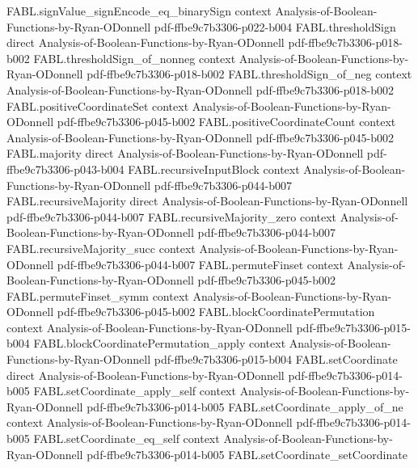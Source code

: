 \begin{theorem}
  {FABL.signValue_signEncode_eq_binarySign}
  {context}
  {Analysis-of-Boolean-Functions-by-Ryan-ODonnell}
  {pdf-ffbe9c7b3306-p022-b004}
\proofstep
  {FABL.thresholdSign}
  {direct}
  {Analysis-of-Boolean-Functions-by-Ryan-ODonnell}
  {pdf-ffbe9c7b3306-p018-b002}
\proofstep
  {FABL.thresholdSign_of_nonneg}
  {context}
  {Analysis-of-Boolean-Functions-by-Ryan-ODonnell}
  {pdf-ffbe9c7b3306-p018-b002}
\proofstep
  {FABL.thresholdSign_of_neg}
  {context}
  {Analysis-of-Boolean-Functions-by-Ryan-ODonnell}
  {pdf-ffbe9c7b3306-p018-b002}
\proofstep
  {FABL.positiveCoordinateSet}
  {context}
  {Analysis-of-Boolean-Functions-by-Ryan-ODonnell}
  {pdf-ffbe9c7b3306-p045-b002}
\proofstep
  {FABL.positiveCoordinateCount}
  {context}
  {Analysis-of-Boolean-Functions-by-Ryan-ODonnell}
  {pdf-ffbe9c7b3306-p045-b002}
\proofstep
  {FABL.majority}
  {direct}
  {Analysis-of-Boolean-Functions-by-Ryan-ODonnell}
  {pdf-ffbe9c7b3306-p043-b004}
\proofstep
  {FABL.recursiveInputBlock}
  {context}
  {Analysis-of-Boolean-Functions-by-Ryan-ODonnell}
  {pdf-ffbe9c7b3306-p044-b007}
\proofstep
  {FABL.recursiveMajority}
  {direct}
  {Analysis-of-Boolean-Functions-by-Ryan-ODonnell}
  {pdf-ffbe9c7b3306-p044-b007}
\proofstep
  {FABL.recursiveMajority_zero}
  {context}
  {Analysis-of-Boolean-Functions-by-Ryan-ODonnell}
  {pdf-ffbe9c7b3306-p044-b007}
\proofstep
  {FABL.recursiveMajority_succ}
  {context}
  {Analysis-of-Boolean-Functions-by-Ryan-ODonnell}
  {pdf-ffbe9c7b3306-p044-b007}
\proofstep
  {FABL.permuteFinset}
  {context}
  {Analysis-of-Boolean-Functions-by-Ryan-ODonnell}
  {pdf-ffbe9c7b3306-p045-b002}
\proofstep
  {FABL.permuteFinset_symm}
  {context}
  {Analysis-of-Boolean-Functions-by-Ryan-ODonnell}
  {pdf-ffbe9c7b3306-p045-b002}
\proofstep
  {FABL.blockCoordinatePermutation}
  {context}
  {Analysis-of-Boolean-Functions-by-Ryan-ODonnell}
  {pdf-ffbe9c7b3306-p015-b004}
\proofstep
  {FABL.blockCoordinatePermutation_apply}
  {context}
  {Analysis-of-Boolean-Functions-by-Ryan-ODonnell}
  {pdf-ffbe9c7b3306-p015-b004}
\proofstep
  {FABL.setCoordinate}
  {direct}
  {Analysis-of-Boolean-Functions-by-Ryan-ODonnell}
  {pdf-ffbe9c7b3306-p014-b005}
\proofstep
  {FABL.setCoordinate_apply_self}
  {context}
  {Analysis-of-Boolean-Functions-by-Ryan-ODonnell}
  {pdf-ffbe9c7b3306-p014-b005}
\proofstep
  {FABL.setCoordinate_apply_of_ne}
  {context}
  {Analysis-of-Boolean-Functions-by-Ryan-ODonnell}
  {pdf-ffbe9c7b3306-p014-b005}
\proofstep
  {FABL.setCoordinate_eq_self}
  {context}
  {Analysis-of-Boolean-Functions-by-Ryan-ODonnell}
  {pdf-ffbe9c7b3306-p014-b005}
\proofstep
  {FABL.setCoordinate_setCoordinate}

\end{theorem}
